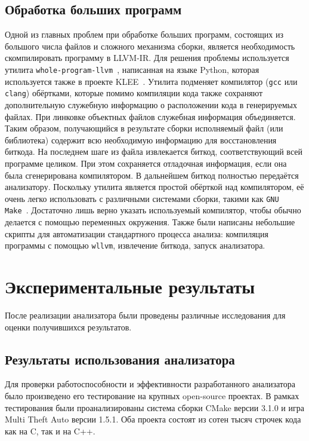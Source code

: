 \subsection{Обработка больших программ}

Одной из главных проблем при обработке больших программ, состоящих из
большого числа файлов и сложного механизма сборки, является
необходимость скомпилировать программу в LLVM-IR. Для решения проблемы
используется утилита \texttt{whole-program-llvm}~\cite{wllvm},
написанная на языке Python, которая используется также в проекте
KLEE~\cite{cadar2008klee}. Утилита подменяет компилятор (\texttt{gcc}
или \texttt{clang}) обёртками, которые помимо компиляции кода также
сохраняют дополнительную служебную информацию о расположении кода в
генерируемых файлах. При линковке объектных файлов служебная
информация объединяется. Таким образом, получающийся в результате
сборки исполняемый файл (или библиотека) содержит всю необходимую
информацию для восстановления биткода. На последнем шаге из файла
извлекается биткод, соответствующий всей программе целиком. При этом
сохраняется отладочная информация, если она была сгенерирована
компилятором. В дальнейшем биткод полностью передаётся
анализатору. Поскольку утилита является простой обёрткой над
компилятором, её очень легко использовать с различными системами
сборки, такими как \texttt{GNU Make}~\cite{gnumake}. Достаточно лишь
верно указать используемый компилятор, чтобы обычно делается с помощью
переменных окружения. Также были написаны небольшие скрипты для
автоматизации стандартного процесса анализа: компиляция программы с
помощью \texttt{wllvm}, извлечение биткода, запуск анализатора.

\section{Экспериментальные результаты}

После реализации анализатора были проведены различные исследования для
оценки получившихся результатов.

\subsection{Результаты использования анализатора}

Для проверки работоспособности и эффективности разработанного
анализатора было произведено его тестирование на крупных open-source
проектах. В рамках тестирования были проанализированы система сборки
CMake версии 3.1.0 и игра Multi Theft Auto версии 1.5.1. Оба проекта
состоят из сотен тысяч строчек кода как на C, так и на C++.

